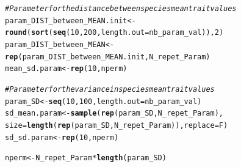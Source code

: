 \documentclass[12pt]{article}\usepackage[]{graphicx}\usepackage[]{color}
\makeatletter
\newcommand{\hlnum}[1]{\textcolor[rgb]{0.686,0.059,0.569}{#1}}%
\newcommand{\hlcom}[1]{\textcolor[rgb]{0.678,0.584,0.686}{\textit{#1}}}%
\newcommand{\hlopt}[1]{\textcolor[rgb]{0,0,0}{#1}}%
\newcommand{\hlstd}[1]{\textcolor[rgb]{0.345,0.345,0.345}{#1}}%
\newcommand{\hlkwb}[1]{\textcolor[rgb]{0.69,0.353,0.396}{#1}}%
\newcommand{\hlkwc}[1]{\textcolor[rgb]{0.333,0.667,0.333}{#1}}%
\newcommand{\hlkwd}[1]{\textcolor[rgb]{0.737,0.353,0.396}{\textbf{#1}}}%
\newenvironment{kframe}{%
 \def\at@end@of@kframe{}%
 \ifinner\ifhmode%
  \def\at@end@of@kframe{\end{minipage}}%
  \begin{minipage}{\columnwidth}%
 \fi\fi%
 \def\FrameCommand##1{\hskip\@totalleftmargin \hskip-\fboxsep
 \colorbox{shadecolor}{##1}\hskip-\fboxsep
     \hskip-\linewidth \hskip-\@totalleftmargin \hskip\columnwidth}%
 \MakeFramed {\advance\hsize-\width
   \@totalleftmargin\z@ \linewidth\hsize
   \@setminipage}}%
 {\par\unskip\endMakeFramed%
 \at@end@of@kframe}
\newenvironment{knitrout}{}{} %
\makeatother
\begin{document}
\begin{knitrout}\small
{}\color{fgcolor}\begin{kframe}
\begin{alltt}
\hlcom{# Parameter for the distance between species mean trait values}
\hlstd{param_DIST_between_MEAN.init} \hlkwb{<-} \hlkwd{round}\hlstd{(}\hlkwd{sort}\hlstd{(}\hlkwd{seq}\hlstd{(}\hlnum{10}\hlstd{,} \hlnum{200}\hlstd{,} \hlkwc{length.out} \hlstd{= nb_param_val)),} \hlnum{2}\hlstd{)}
\hlstd{param_DIST_between_MEAN} \hlkwb{<-} \hlkwd{rep}\hlstd{(param_DIST_between_MEAN.init, N_repet_Param)}
\hlstd{mean_sd.param} \hlkwb{<-} \hlkwd{rep}\hlstd{(}\hlnum{10}\hlstd{, nperm)}

\hlcom{# Parameter for the variance in species mean trait values}
\hlstd{param_SD} \hlkwb{<-} \hlkwd{seq}\hlstd{(}\hlnum{10}\hlstd{,} \hlnum{100}\hlstd{,}\hlkwc{length.out} \hlstd{= nb_param_val)}
\hlstd{sd_mean.param} \hlkwb{<-} \hlkwd{sample} \hlstd{(}\hlkwd{rep}\hlstd{(param_SD, N_repet_Param),}
       \hlkwc{size} \hlstd{=} \hlkwd{length}\hlstd{(}\hlkwd{rep}\hlstd{(param_SD, N_repet_Param)),} \hlkwc{replace} \hlstd{= F)}
\hlstd{sd_sd.param} \hlkwb{<-} \hlkwd{rep}\hlstd{(}\hlnum{10}\hlstd{, nperm)}

\hlstd{nperm} \hlkwb{<-} \hlstd{N_repet_Param}\hlopt{*}\hlkwd{length}\hlstd{(param_SD)}
\end{alltt}
\end{kframe}
\end{knitrout}
\end{document}
